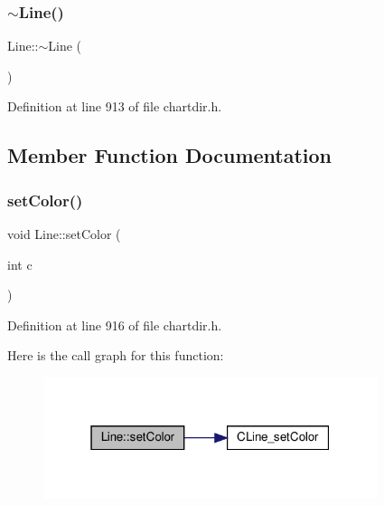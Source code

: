\subsubsection{\texorpdfstring{$\sim$\+Line()}{~Line()}}
{\footnotesize\ttfamily Line\+::$\sim$\+Line (\begin{DoxyParamCaption}{ }\end{DoxyParamCaption})\hspace{0.3cm}{\ttfamily [inline]}}



Definition at line 913 of file chartdir.\+h.



\subsection{Member Function Documentation}
\mbox{\label{class_line_ab542d562a46e4e64ba4e7d79e3d29c51}} 
\subsubsection{\texorpdfstring{set\+Color()}{setColor()}}
{\footnotesize\ttfamily void Line\+::set\+Color (\begin{DoxyParamCaption}\item[{int}]{c }\end{DoxyParamCaption})\hspace{0.3cm}{\ttfamily [inline]}}



Definition at line 916 of file chartdir.\+h.

Here is the call graph for this function\+:
\nopagebreak
\begin{figure}[H]
\begin{center}
\leavevmode
\includegraphics[width=277pt]{class_line_ab542d562a46e4e64ba4e7d79e3d29c51_cgraph}
\end{center}
\end{figure}
\mbox{\label{class_line_ad0534be1075fb29d13c0faa823c91e7f}} 
